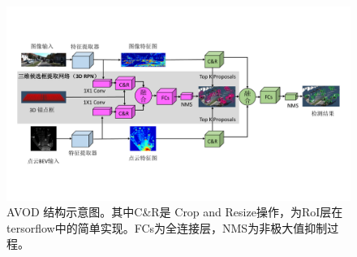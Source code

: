 \begin{figure}[!t]
	\centering
	\includegraphics[trim={1cm, 3.5cm, 1cm, 3.5cm}, clip,width=\textwidth]{./imgs/avod.pdf}
	\caption{AVOD 结构示意图\cite{ku2018joint}。其中C\&R是 Crop and Resize操作，为RoI层在tersorflow中的简单实现。FCs为全连接层，NMS为非极大值抑制过程。}
	\label{fig:avod}
\end{figure}
